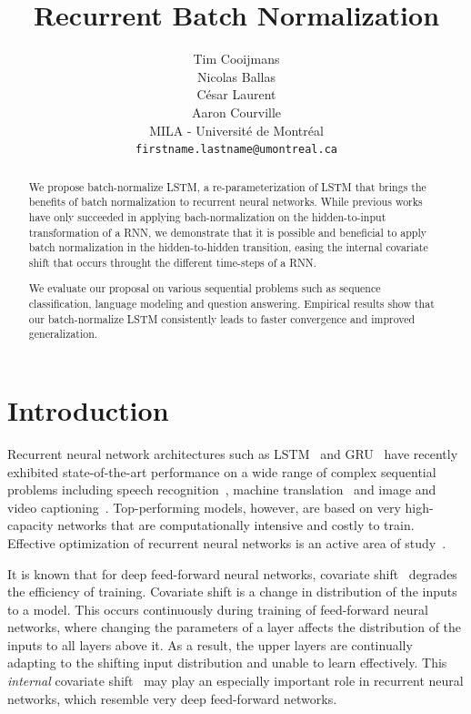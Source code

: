 \documentclass{article} %
\title{Recurrent Batch Normalization}
\author{
Tim Cooijmans \\
\And
Nicolas Ballas \\
\And
C\'esar Laurent\\
\And
Aaron Courville\\
MILA - Universit\'e de Montr\'eal\\
\texttt{firstname.lastname@umontreal.ca} \\
}
\begin{document}
\maketitle

\begin{abstract}

We propose batch-normalize LSTM, a re-parameterization of LSTM that brings the benefits of batch normalization to recurrent neural networks.
While previous works have only succeeded in applying bach-normalization on the hidden-to-input transformation of a RNN,
we demonstrate that it is possible and beneficial to apply batch normalization in the hidden-to-hidden transition, easing the internal covariate shift
that occurs throught the different time-steps of a RNN.

We evaluate our proposal on various sequential problems such as sequence classification, language modeling and question answering.
Empirical results show that our batch-normalize LSTM consistently leads to faster convergence and improved generalization.
\end{abstract}

\section{Introduction}

Recurrent neural network architectures such as LSTM~\cite{lstm} and GRU~\cite{cho2014learning} have recently exhibited
state-of-the-art performance on a wide range of complex sequential problems including speech recognition~\cite{baidu},
machine translation~\cite{bahdanau2014neural} and image and video captioning~\cite{xu2015show,yao2015describing}.
Top-performing models, however, are based on very high-capacity networks that are computationally intensive and costly to train.
Effective optimization of recurrent neural networks is an active area of study~\cite{pascanudifficulty,hessianfree,ollivier}.

It is known that for deep feed-forward neural networks, covariate shift~\cite{shimodaira2000improving,batchnorm}
degrades the efficiency of training.
Covariate shift is a change in distribution of the inputs to a model.
This occurs continuously during training of feed-forward neural networks,
where changing the parameters of a layer affects the distribution of the inputs to all layers above it.
As a result, the upper layers are continually adapting to the shifting input distribution and unable to learn effectively.
This \emph{internal} covariate shift~\cite{batchnorm} may play an especially important role in recurrent neural networks,
which resemble very deep feed-forward networks.
\end{document}
